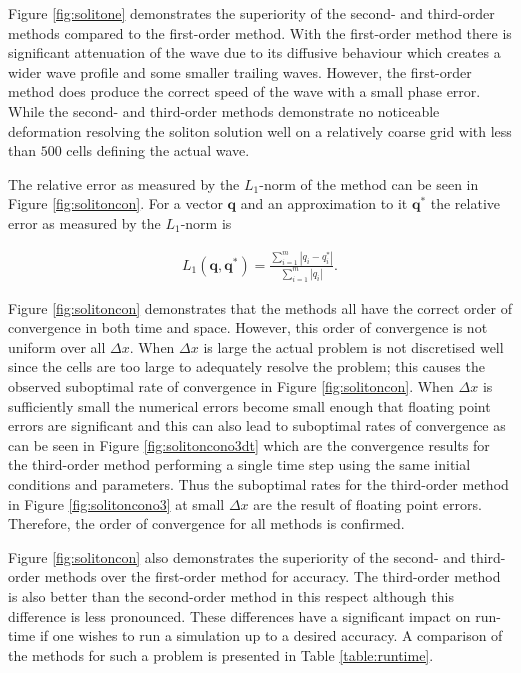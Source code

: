 \documentclass[SingleSpace,12pt,Proceedings]{Serre_ASCE}
\begin{document}
Figure \ref{fig:solitone} demonstrates the superiority of the second- and third-order methods compared to the first-order method. With the first-order method there is significant attenuation of the wave due to its diffusive behaviour which creates a wider wave profile and some smaller trailing waves. However, the first-order method does produce the correct speed of the wave with a small phase error. While the second- and third-order methods demonstrate no noticeable deformation resolving the soliton solution well on a relatively coarse grid with less than $500$ cells defining the actual wave.

The relative error as measured by the $L_1$-norm of the method can be seen in Figure \ref{fig:solitoncon}. For a vector $\boldsymbol{q}$ and an approximation to it $\boldsymbol{q}^*$ the relative error as measured by the $L_1$-norm is
\begin{linenomath*}
\begin{gather*}
L_1 \left(\boldsymbol{q},\boldsymbol{q}^*\right) = \frac{\sum_{i=1}^{m} |q_i - q^*_i|}{\sum_{i=1}^{m} |q_i|}.
\end{gather*}
\end{linenomath*}

Figure \ref{fig:solitoncon} demonstrates that the methods all have the correct order of convergence in both time and space. However, this order of convergence is not uniform over all $\Delta x$. When $\Delta x$ is large the actual problem is not discretised well since the cells are too large to adequately resolve the problem; this causes the observed suboptimal rate of convergence in Figure \ref{fig:solitoncon}. When $\Delta x$ is sufficiently small the numerical errors become small enough that floating point errors are significant and this can also lead to suboptimal rates of convergence as can be seen in Figure \ref{fig:solitoncono3dt} which are the convergence results for the third-order method performing a single time step using the same initial conditions and parameters. Thus the suboptimal rates for the third-order method in Figure \ref{fig:solitoncono3} at small $\Delta x$ are the result of floating point errors. Therefore, the order of convergence for all methods is confirmed.

Figure \ref{fig:solitoncon} also demonstrates the superiority of the second- and third-order methods over the first-order method for accuracy. The third-order method is also better than the second-order method in this respect although this difference is less pronounced. These differences have a significant impact on run-time if one wishes to run a simulation up to a desired accuracy. A comparison of the methods for such a problem is presented in Table \ref{table:runtime}.
\end{document}

